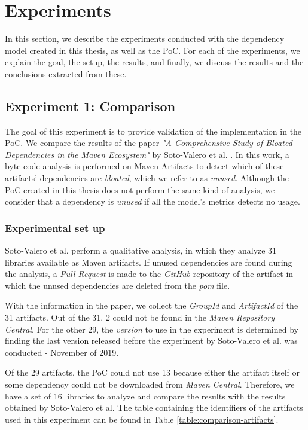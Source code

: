 \chapter{Experiments}\label{ch:Experiments}
In this section, we describe the experiments conducted with the dependency model created in this thesis, as well as the PoC. For each of the experiments, we explain the goal, the setup, the results, and finally, we discuss the results and the conclusions extracted from these.

\section{Experiment 1: Comparison}\label{sec:Exp1}
The goal of this experiment is to provide validation of the implementation in the PoC. We compare the results of the paper \textit{"A Comprehensive Study of Bloated Dependencies in the Maven Ecosystem"} by Soto-Valero et al. \cite{soto2020comprehensive}. In this work, a byte-code analysis is performed on Maven Artifacts to detect which of these artifacts' dependencies are \textit{bloated}, which we refer to as \textit{unused}. Although the PoC created in this thesis does not perform the same kind of analysis, we consider that a dependency is \textit{unused} if all the model's metrics detects no usage.

\subsection{Experimental set up}
Soto-Valero et al. perform a qualitative analysis, in which they analyze 31 libraries available as Maven artifacts. If unused dependencies are found during the analysis, a \textit{Pull Request} is made to the \textit{GitHub} repository of the artifact in which the unused dependencies are deleted from the \textit{pom} file.

With the information in the paper, we collect the \textit{GroupId} and \textit{ArtifactId} of the 31 artifacts. Out of the 31, 2 could not be found in the \textit{Maven Repository Central}. For the other 29, the \textit{version} to use in the experiment is determined by finding the last version released before the experiment by Soto-Valero et al. was conducted - November of 2019.

Of the 29 artifacts, the PoC could not use 13 because either the artifact itself or some dependency could not be downloaded from \textit{Maven Central}. Therefore, we have a set of 16 libraries to analyze and compare the results with the results obtained by Soto-Valero et al. The table containing the identifiers of the artifacts used in this experiment can be found in Table \ref{table:comparison-artifacts}.

